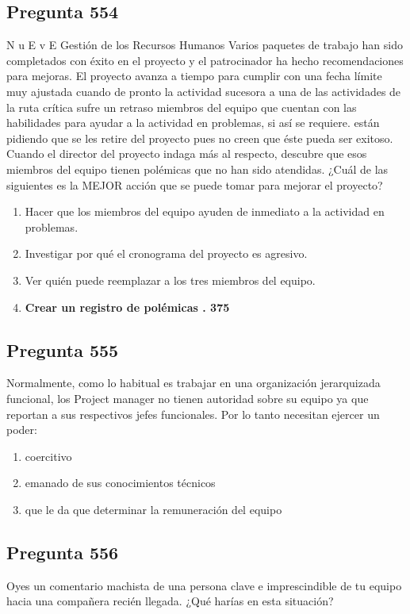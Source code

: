 \documentclass[11pt,a4paper]{article}
\begin{document}
\subsection*{Pregunta 554}
N u E v E Gestión de los Recursos Humanos Varios paquetes de trabajo han sido completados con éxito en el proyecto y el patrocinador ha hecho recomendaciones para mejoras. El proyecto avanza a tiempo para cumplir con una fecha límite muy ajustada cuando de pronto la actividad sucesora a una de las actividades de la ruta crítica sufre un retraso miembros del equipo que cuentan con las habilidades para ayudar a la actividad en problemas, si así se requiere. están pidiendo que se les retire del proyecto pues no creen que éste pueda ser exitoso. Cuando el director del proyecto indaga más al respecto, descubre que esos miembros del equipo tienen polémicas que no han sido atendidas. ¿Cuál de las siguientes es la MEJOR acción que se puede tomar para mejorar el proyecto?

\begin{enumerate}[label=\alph*)]
  \item Hacer que los miembros del equipo ayuden de inmediato a la actividad en problemas.
  \item Investigar por qué el cronograma del proyecto es agresivo.
  \item Ver quién puede reemplazar a los tres miembros del equipo.
  \item \textbf{Crear un registro de polémicas . 375}
\end{enumerate}

\subsection*{Pregunta 555}
Normalmente, como lo habitual es trabajar en una organización jerarquizada funcional, los Project manager no tienen autoridad sobre su equipo ya que reportan a sus respectivos jefes funcionales. Por lo tanto necesitan ejercer un poder:

\begin{enumerate}[label=\alph*)]
  \item coercitivo
  \item emanado de sus conocimientos técnicos
  \item que le da que determinar la remuneración del equipo
\end{enumerate}

\subsection*{Pregunta 556}
Oyes un comentario machista de una persona clave e imprescindible de tu equipo hacia una compañera recién llegada. ¿Qué harías en esta situación?
\end{document}
